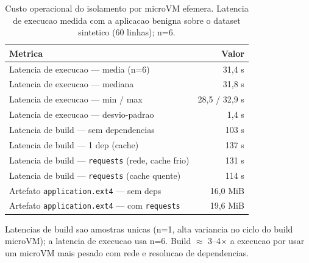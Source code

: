 \begin{table}[t]
\centering
\caption{Custo operacional do isolamento por microVM efemera. Latencia de execucao medida com a aplicacao benigna sobre o dataset sintetico (60 linhas); n=6.}
\label{tab:performance}
\footnotesize
\begin{tabularx}{\columnwidth}{@{}Xr@{}}
\toprule
Metrica & Valor \\
\midrule
Latencia de execucao --- media (n=6) & 31{,}4 s \\
Latencia de execucao --- mediana & 31{,}8 s \\
Latencia de execucao --- min / max & 28{,}5 / 32{,}9 s \\
Latencia de execucao --- desvio-padrao & 1{,}4 s \\
\addlinespace
Latencia de build --- sem dependencias & 103 s \\
Latencia de build --- 1 dep (cache) & 137 s \\
Latencia de build --- \texttt{requests} (rede, cache frio) & 131 s \\
Latencia de build --- \texttt{requests} (cache quente) & 114 s \\
\addlinespace
Artefato \texttt{application.ext4} --- sem deps & 16{,}0 MiB \\
Artefato \texttt{application.ext4} --- com \texttt{requests} & 19{,}6 MiB \\
\bottomrule
\end{tabularx}
\par\smallskip
{\footnotesize Latencias de build sao amostras unicas (n=1, alta variancia no ciclo do build microVM); a latencia de execucao usa n=6. Build $\approx$ 3--4$\times$ a execucao por usar um microVM mais pesado com rede e resolucao de dependencias.}
\end{table}
